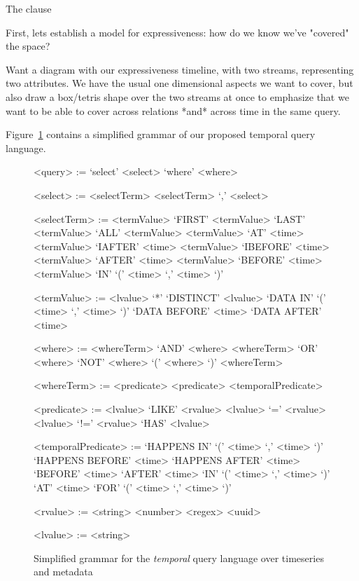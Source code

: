 
The  clause 

First, lets establish a model for expressiveness: how do we know we've "covered" the space?

Want a diagram with our expressiveness timeline, with two streams, representing two attributes. We
have the usual one dimensional aspects we want to cover, but also draw a box/tetris shape over
the two streams at once to emphasize that we want to be able to cover across relations *and* across
time in the same query.
\fi

Figure~\ref{fig:temporalgrammar} contains a simplified grammar of our proposed temporal query language.

\setlength{\grammarindent}{8em}
\setlength{\grammarparsep}{4pt}
\begin{figure}
\centering
\begin{grammar}
<query> := `select' <select> `where' <where>

<select> := <selectTerm>
\alt <selectTerm> `,' <select>

<selectTerm> := <termValue>
\alt `FIRST' <termValue>
\alt `LAST' <termValue>
\alt `ALL' <termValue>
\alt <termValue> `AT' <time>
\alt <termValue> `IAFTER' <time>
\alt <termValue> `IBEFORE' <time>
\alt <termValue> `AFTER' <time>
\alt <termValue> `BEFORE' <time>
\alt <termValue> `IN' `(' <time> `,' <time> `)'

<termValue> := <lvalue>
\alt `*'
\alt `DISTINCT' <lvalue>
\alt `DATA IN' `(' <time> `,' <time> `)'
\alt `DATA BEFORE' <time>
\alt `DATA AFTER' <time>

<where> := <whereTerm> `AND' <where>
\alt <whereTerm> `OR' <where>
\alt `NOT' <where>
\alt `(' <where> `)'
\alt <whereTerm>

<whereTerm> := <predicate>
\alt <predicate> <temporalPredicate>

<predicate> := <lvalue> `LIKE' <rvalue>
\alt <lvalue> `=' <rvalue>
\alt <lvalue> `!=' <rvalue>
\alt `HAS' <lvalue>

<temporalPredicate> := `HAPPENS IN' `(' <time> `,' <time> `)'
\alt `HAPPENS BEFORE' <time>
\alt `HAPPENS AFTER' <time>
\alt `BEFORE' <time>
\alt `AFTER' <time>
\alt `IN' `(' <time> `,' <time> `)'
\alt `AT' <time>
\alt `FOR' `(' <time> `,' <time> `)'

<rvalue> := <string>
\alt <number>
\alt <regex>
\alt <uuid>

<lvalue> := <string>
\end{grammar}
\caption{Simplified grammar for the \emph{temporal} query language over timeseries and metadata}
\label{fig:temporalgrammar}
\end{figure}

